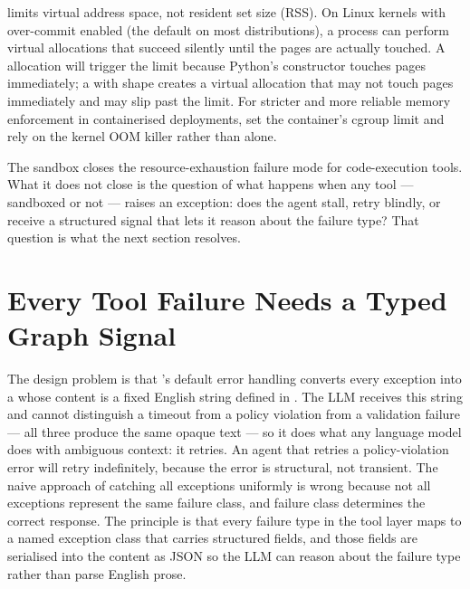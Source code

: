 \begin{warningbox}
 limits virtual address space, not resident set size (RSS).
On Linux kernels with over-commit enabled (the default on most distributions),
a process can perform virtual allocations that succeed silently until the
pages are actually touched. A  allocation will trigger the
limit because Python's  constructor touches pages immediately;
a  with shape 
creates a virtual allocation that may not touch pages immediately and may
slip past the limit. For stricter and more reliable memory enforcement in
containerised deployments, set the container's  cgroup limit
and rely on the kernel OOM killer rather than  alone.
\end{warningbox}

The sandbox closes the resource-exhaustion failure mode for code-execution
tools. What it does not close is the question of what happens when any tool
--- sandboxed or not --- raises an exception: does the agent stall, retry
blindly, or receive a structured signal that lets it reason about the
failure type? That question is what the next section resolves.


\section{Every Tool Failure Needs a Typed Graph Signal}
\label{sec:tool-errors}

The design problem is that 's default error handling converts
every exception into a  whose content is a fixed English
string defined in . The LLM receives this
string and cannot distinguish a timeout from a policy violation from a
validation failure --- all three produce the same opaque text --- so it
does what any language model does with ambiguous context: it retries. An
agent that retries a policy-violation error will retry indefinitely, because
the error is structural, not transient. The naive approach of catching all
exceptions uniformly is wrong because not all exceptions represent the same
failure class, and failure class determines the correct response. The
principle is that every failure type in the tool layer maps to a named
exception class that carries structured fields, and those fields are
serialised into the  content as JSON so the LLM can
reason about the failure type rather than parse English prose.

